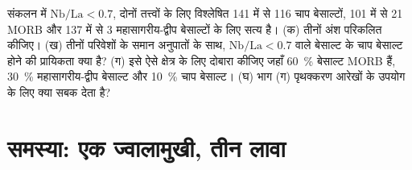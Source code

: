 \begin{exercise}[$\star\star\star$]\label{exo:b2:magmatic-series:12}
संकलन में $\mathrm{Nb}/\mathrm{La} < 0.7$, दोनों तत्त्वों के लिए विश्लेषित 141 में से 116 चाप बेसाल्टों,
101 में से 21 MORB और 137 में से 3 महासागरीय-द्वीप बेसाल्टों के लिए सत्य है। (क) तीनों
अंश परिकलित कीजिए। (ख) तीनों परिवेशों के समान अनुपातों के साथ, $\mathrm{Nb}/\mathrm{La} < 0.7$ वाले बेसाल्ट के
चाप बेसाल्ट होने की प्रायिकता क्या है? (ग)
इसे ऐसे क्षेत्र के लिए दोबारा कीजिए जहाँ \qty{60}{\percent} बेसाल्ट MORB हैं, \qty{30}{\percent}
महासागरीय-द्वीप बेसाल्ट और \qty{10}{\percent} चाप बेसाल्ट। (घ) भाग (ग) पृथक्करण आरेखों के उपयोग के लिए
क्या सबक देता है?
\end{exercise}

\section{समस्या: एक ज्वालामुखी, तीन लावा}

